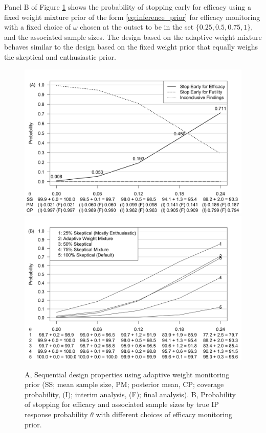 \documentclass[AMA,STIX1COL,doublespace]{WileyNJD-v2}
\begin{document}
Panel B of Figure \ref{fig:ex2varyomega} shows the probability of stopping early for efficacy using a fixed weight mixture prior of the form \eqref{eq:inference_prior}  for efficacy monitoring with a fixed choice of $\omega$ chosen at the outset to be in the set $\{0.25,0.5,0.75,1\}$, and the associated sample sizes.
%
%
The design based on the adaptive weight mixture behaves similar to the design based on the fixed weight prior that equally weighs the skeptical and enthusiastic prior.

\begin{figure}
\begin{center}
      \includegraphics[width=6in]{figure9.png}
   \includegraphics[width=6in]{figure6.png}
    \caption{A, Sequential design properties using adaptive weight monitoring prior (SS; mean sample size, PM; posterior mean, CP; coverage probability, (I); interim analysis, (F); final analysis). B, Probability of stopping for efficacy and associated sample sizes by true IP response probability $\theta$ with different choices of efficacy monitoring prior.}
\label{fig:ex2varyomega}
 \end{center}
\end{figure}
\end{document}
